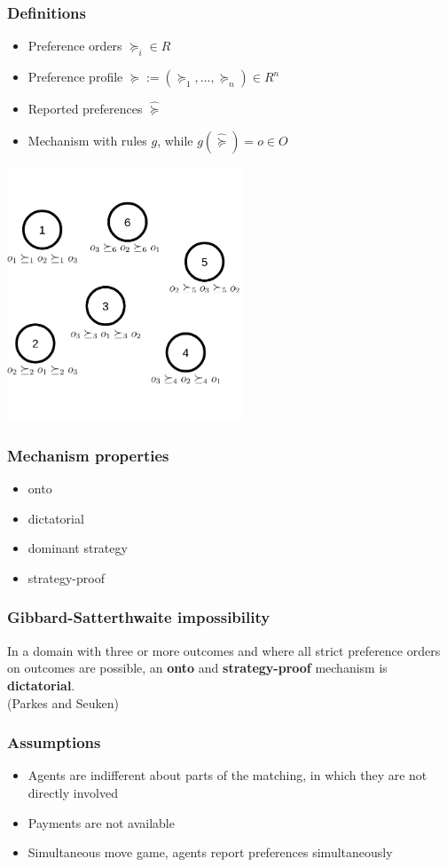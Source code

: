 \begin{frame}
\frametitle{Definitions}
\begin{itemize}[<+->]
\item Preference orders $\succeq_i \in R$
\item Preference profile $\succeq := (\succeq_1,\ldots, \succeq_n) \in R^n$
\item Reported preferences $\hat{\succeq}$
\item Mechanism with rules $g$, while $g(\hat{\succeq}) = o \in O$
\end{itemize}
\centering
\includegraphics[width=7cm]{img/intro/agents_preferences.png}
\end{frame}


\begin{frame}
\frametitle{Mechanism properties}
\begin{itemize}[<+->]
\item onto
\item dictatorial
\item dominant strategy
\item strategy-proof
\end{itemize}
\end{frame}

\begin{frame}
\frametitle{Gibbard-Satterthwaite impossibility}
In a domain with three or more outcomes and where all strict preference orders on outcomes are possible, an \textbf{onto} and \textbf{strategy-proof} mechanism is \textbf{dictatorial}. \\
(Parkes and Seuken)

\end{frame}

\begin{frame}
\frametitle{Assumptions}
\begin{itemize}[<+->]
\item Agents are indifferent about parts of the matching, in which they are not directly involved
\item Payments are not available 
\item Simultaneous move game, agents report preferences simultaneously

\end{itemize}
\end{frame}